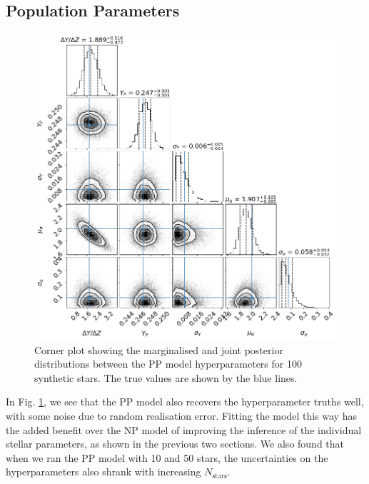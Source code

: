 \subsection{Population Parameters}

\begin{figure}
    \centering
    \includegraphics[width=\linewidth]{figures/corner_plot_pp_truths.png}
    \caption[Corner plot showing the marginalised and joint posterior distributions between the PP model hyperparameters for 100 synthetic stars.]{Corner plot showing the marginalised and joint posterior distributions between the PP model hyperparameters for 100 synthetic stars. The true values are shown by the blue lines.}  
    \label{fig:test-corners-pp}   
\end{figure}

In Fig. \ref{fig:test-corners-pp}, we see that the PP model also recovers the hyperparameter truths well, with some noise due to random realisation error. Fitting the model this way has the added benefit over the NP model of improving the inference of the individual stellar parameters, as shown in the previous two sections. We also found that when we ran the PP model with 10 and 50 stars, the uncertainties on the hyperparameters also shrank with increasing $N_\mathrm{stars}$.

